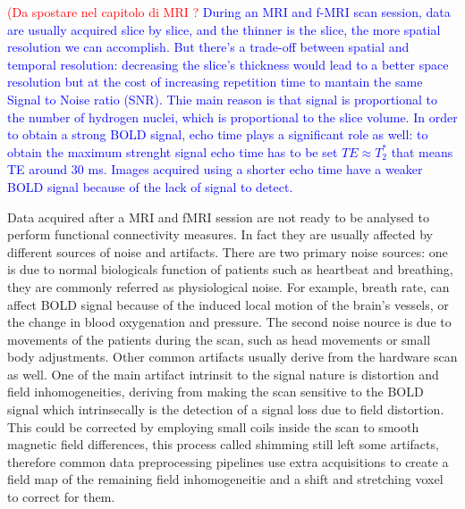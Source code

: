 \documentclass[10pt]{report}
\begin{document}
\textcolor{red}{(Da spostare nel capitolo di MRI ?} \textcolor{blue}{ During an MRI and f-MRI scan session, data are usually acquired slice by slice, and the thinner is the slice, the more spatial resolution we can accomplish.
But there's a trade-off between spatial and temporal resolution: decreasing the slice's thickness would lead to a better space resolution but at the cost of increasing repetition time to mantain the same Signal to Noise ratio (SNR).
Thie main reason is that signal is proportional to the number of hydrogen nuclei, which is proportional to the slice volume.
In order to obtain a strong BOLD signal, echo time plays a significant role as well: to obtain the maximum strenght signal echo time has to be set $TE \approx T_2^{\ast}$ that means TE around 30 ms.
Images acquired using a shorter echo time have a weaker BOLD signal because of the lack of signal to detect. \cite{jenkinson2018}
}

Data acquired after a MRI and fMRI session are not ready to be analysed to perform functional connectivity measures. In fact they are usually affected by different sources of noise and artifacts.
There are two primary noise sources: one is due to normal biologicals function of patients such as heartbeat and breathing, they are commonly referred as physiological noise. For example, breath rate, can affect BOLD signal because of the induced local motion of the brain's vessels, or the change in blood oxygenation and pressure. The second noise nource is due to movements of the patients during the scan, such as head movements or small body adjustments.
Other common artifacts usually derive from the hardware scan as well.
One of the main artifact intrinsit to the signal nature is distortion and field inhomogeneities, deriving from making the scan sensitive to the BOLD signal which intrinsecally is the detection of a signal loss due to field distortion.
This could be corrected by employing small coils inside the scan to smooth magnetic field differences, this process called shimming still left some artifacts, therefore common data preprocessing pipelines use extra acquisitions to create a field map of the remaining field inhomogeneitie and a shift and stretching voxel to correct for them.\cite{bijsterbosch2017}
\end{document}

